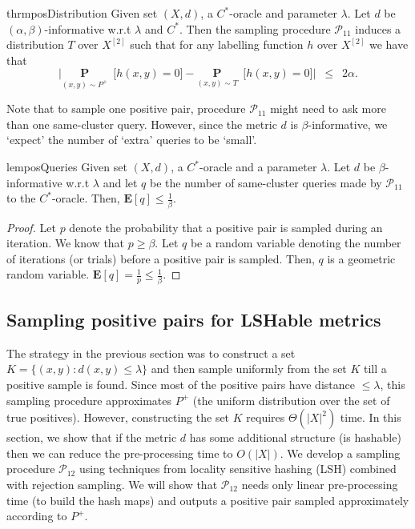 \documentclass[12pt]{article}
\newcommand{\mb}{\mathbf}
\newcommand{\mc}{\mathcal}
\begin{document}
\begin{restatable}{thrm}{posDistribution}
\label{thm:posDistribution}
Given set $(X, d)$, a $C^*$-oracle and parameter $\lambda$. Let $d$ be $(\alpha, \beta)$-informative w.r.t $\lambda$ and $C^*$.  Then the sampling procedure $\mc P_{11}$ induces a distribution $T$ over $X^{[2]}$ such that for any labelling function $h$ over $X^{[2]}$ we have that $$\Big|\underset{(x, y) \sim P^+}{\mb P}\enspace \big[ h(x, y) = 0 ] - \underset{(x, y) \sim T}{\mb P}\enspace \big[ h(x, y) = 0 ]\Big|  \enspace \le \enspace 2\alpha.$$ 
\end{restatable}


\noindent Note that to sample one positive pair, procedure $\mc P_{11}$ might need to ask more than one same-cluster query. However, since the metric $d$ is $\beta$-informative, we `expect' the number of `extra' queries to be `small'. 

\begin{restatable}{lem}{posQueries}
\label{lemma:posQueries}
Given set $(X, d)$, a $C^*$-oracle and a parameter $\lambda$. Let $d$ be $\beta$-informative w.r.t $\lambda$ and let $q$ be the number of same-cluster queries made by $\mc P_{11}$ to the $C^*$-oracle. Then, $\mb E[q] \le \frac{1}{\beta}$.
\end{restatable}
\begin{proof}
Let $p$ denote the probability that a positive pair is sampled during an iteration. We know that $p \ge \beta$. Let $q$ be a random variable denoting the number of iterations (or trials) before a positive pair is sampled. Then, $q$ is a geometric random variable. $\mb E[q] = \frac{1}{p} \le \frac{1}{\beta}$.
\end{proof}

\subsection{Sampling positive pairs for LSHable metrics}
\label{section:samplingPositiveLSHable}

The strategy in the previous section was to construct a set $K = \{(x, y): d(x, y) \le \lambda\}$ and then sample uniformly from the set $K$ till a positive sample is found. Since most of the positive pairs have distance $\le \lambda$, this sampling procedure approximates $P^+$ (the uniform distribution over the set of true positives). However, constructing the set $K$ requires $\Theta(|X|^2)$ time. In this section, we show that if the metric $d$ has some additional structure (is hashable) then we can reduce the pre-processing time to $O(|X|)$. We develop a sampling procedure $\mc P_{12}$ using techniques from locality sensitive hashing (LSH) combined with rejection sampling. We will show that $\mc P_{12}$ needs only linear pre-processing time (to build the hash maps) and outputs a positive pair sampled approximately according to $P^+$.\\
\end{document}
